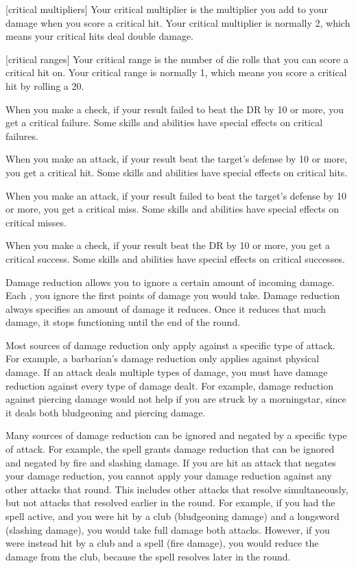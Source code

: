 [critical multipliers] Your critical multiplier is the multiplier you add to your damage when you score a critical hit.
Your critical multiplier is normally 2, which means your critical hits deal double damage.

[critical ranges] Your critical range is the number of die rolls that you can score a critical hit on.
Your critical range is normally 1, which means you score a critical hit by rolling a 20.

 When you make a check, if your result failed to beat the DR by 10 or more, you get a critical failure.
Some skills and abilities have special effects on critical failures.

 When you make an attack, if your result beat the target's defense by 10 or more, you get a critical hit.
Some skills and abilities have special effects on critical hits.

 When you make an attack, if your result failed to beat the target's defense by 10 or more, you get a critical miss.
Some skills and abilities have special effects on critical misses.

 When you make a check, if your result beat the DR by 10 or more, you get a critical success.
Some skills and abilities have special effects on critical successes.

 Damage reduction allows you to ignore a certain amount of incoming damage.
Each , you ignore the first points of damage you would take.
Damage reduction always specifies an amount of damage it reduces.
Once it reduces that much damage, it stops functioning until the end of the round.

Most sources of damage reduction only apply against a specific type of attack.
For example, a barbarian's damage reduction only applies against physical damage.
If an attack deals multiple types of damage, you must have damage reduction against every type of damage dealt.
For example, damage reduction against piercing damage would not help if you are struck by a morningstar, since it deals both bludgeoning and piercing damage.

Many sources of damage reduction can be ignored and negated by a specific type of attack.
For example, the  spell grants damage reduction that can be ignored and negated by fire and slashing damage.
If you are hit an attack that negates your damage reduction, you cannot apply your damage reduction against any other attacks that round.
This includes other attacks that resolve simultaneously, but not attacks that resolved earlier in the round.
For example, if you had the  spell active, and you were hit by a club (bludgeoning damage) and a longsword (slashing damage), you would take full damage both attacks.
However, if you were instead hit by a club and a  spell (fire damage), you would reduce the damage from the club, because the spell resolves later in the round.

